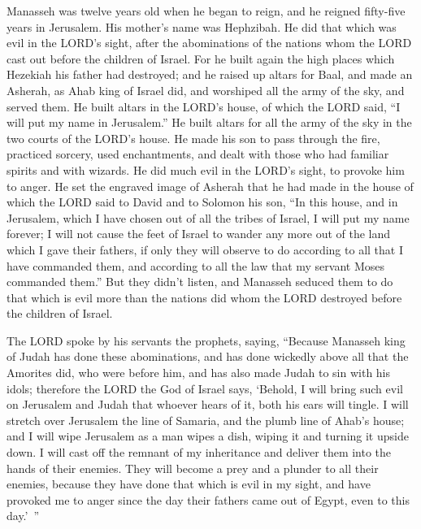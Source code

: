 \mychapter{} \myverse*{}Manasseh was twelve years old when he began to reign, and he reigned
fifty-five years in Jerusalem. His mother’s name was Hephzibah.
\myverse{}He did that which was evil in the LORD’s sight, after the abominations of the
nations whom the LORD cast out before the children of Israel.
\myverse{}For he built again the high places which Hezekiah his father had destroyed;
and he raised up altars for Baal, and made an Asherah, as Ahab king of Israel did, and worshiped all the
army of the sky, and served them.
\myverse{}He built altars in the LORD’s house, of which the LORD said, “I will put my
name in Jerusalem.”
\myverse{}He built altars for all the army of the sky in the two courts of the LORD’s
house.
\myverse{}He made his son to pass through the fire, practiced sorcery, used enchantments,
and dealt with those who had familiar spirits and with wizards. He did much evil in the LORD’s sight,
to provoke him to anger.
\myverse{}He set the engraved image of Asherah that he had made in the house of which
the LORD said to David and to Solomon his son, “In this house, and in Jerusalem, which I have chosen out
of all the tribes of Israel, I will put my name forever;
\myverse{}I will not cause the feet of Israel to wander any more out of the land which
I gave their fathers, if only they will observe to do according to all that I have commanded them, and
according to all the law that my servant Moses commanded them.”
\myverse{}But they didn’t listen, and Manasseh seduced them to do that which is evil
more than the nations did whom the LORD destroyed before the children of Israel.

\myverse{}The LORD spoke by his servants the prophets, saying,
\myverse{}“Because Manasseh king of Judah has done these abominations, and has done
wickedly above all that the Amorites did, who were before him, and has also made Judah to sin with his
idols;
\myverse{}therefore the LORD the God of Israel says, ‘Behold, I will bring such evil
on Jerusalem and Judah that whoever hears of it, both his ears will tingle.
\myverse{}I will stretch over Jerusalem the line of Samaria, and the plumb line of
Ahab’s house; and I will wipe Jerusalem as a man wipes a dish, wiping it and turning it upside down.
\myverse{}I will cast off the remnant of my inheritance and deliver them into the hands
of their enemies. They will become a prey and a plunder to all their enemies,
\myverse{}because they have done that which is evil in my sight, and have provoked
me to anger since the day their fathers came out of Egypt, even to this day.’ ”

